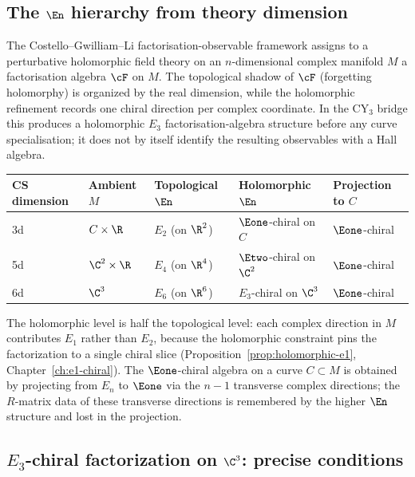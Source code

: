 \subsection{The \texorpdfstring{$\En$}{E-n} hierarchy from theory dimension}
\label{subsec:en-theory-dimension}

The Costello--Gwilliam--Li factorisation-observable framework assigns to a perturbative holomorphic field theory on an $n$-dimensional complex manifold $M$ a factorisation algebra $\cF$ on $M$. The topological shadow of $\cF$ (forgetting holomorphy) is organized by the real dimension, while the holomorphic refinement records one chiral direction per complex coordinate. In the CY$_3$ bridge this produces a holomorphic $E_3$ factorisation-algebra structure before any curve specialisation; it does not by itself identify the resulting observables with a Hall algebra.

\begin{center}
\renewcommand{\arraystretch}{1.3}
\small
\begin{tabular}{lllll}
 \toprule
 CS dimension & Ambient $M$ & Topological $\En$ & Holomorphic $\En$ & Projection to $C$ \\
 \midrule
 3d & $C \times \R$ & $E_2$ (on $\R^2$) & $\Eone$-chiral on $C$ & $\Eone$-chiral \\
 5d & $\C^2 \times \R$ & $E_4$ (on $\R^4$) & $\Etwo$-chiral on $\C^2$ & $\Eone$-chiral \\
 6d & $\C^3$ & $E_6$ (on $\R^6$) & $E_3$-chiral on $\C^3$ & $\Eone$-chiral \\
 \bottomrule
\end{tabular}
\end{center}

\noindent The holomorphic level is half the topological level: each complex direction in $M$ contributes $E_1$ rather than $E_2$, because the holomorphic constraint pins the factorization to a single chiral slice (Proposition~\ref{prop:holomorphic-e1}, Chapter~\ref{ch:e1-chiral}). The $\Eone$-chiral algebra on a curve $C \subset M$ is obtained by projecting from $E_n$ to $\Eone$ via the $n-1$ transverse complex directions; the $R$-matrix data of these transverse directions is remembered by the higher $\En$ structure and lost in the projection.

\subsection{\texorpdfstring{$E_3$}{E-3}-chiral factorization on \texorpdfstring{$\C^3$}{C-3}: precise conditions}
\label{subsec:e3-precise}

